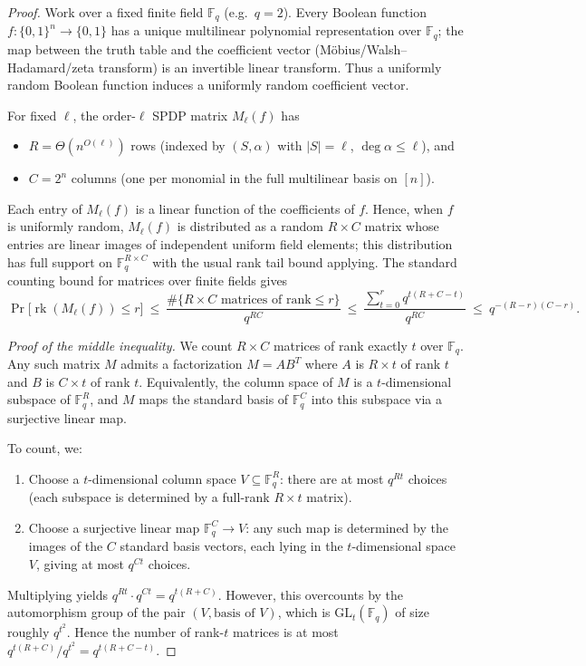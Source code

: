 \documentclass[12pt]{article}
\theoremstyle{definition}
\theoremstyle{definition}
\theoremstyle{remark}
\theoremstyle{remark}
\begin{document}
\begin{proof}
Work over a fixed finite field $\mathbb{F}_q$ (e.g.\ $q=2$). Every Boolean function $f:\{0,1\}^n\to\{0,1\}$ has a unique multilinear polynomial representation over $\mathbb{F}_q$; the map between the truth table and the coefficient vector (Möbius/Walsh--Hadamard/zeta transform) is an invertible linear transform. Thus a uniformly random Boolean function induces a uniformly random coefficient vector.

For fixed $\ell$, the order-$\ell$ SPDP matrix $M_\ell(f)$ has
\begin{itemize}
\item $R = \Theta(n^{O(\ell)})$ rows (indexed by $(S,\alpha)$ with $|S|=\ell$, $\deg\alpha\le\ell$), and
\item $C = 2^n$ columns (one per monomial in the full multilinear basis on $[n]$).
\end{itemize}

Each entry of $M_\ell(f)$ is a linear function of the coefficients of $f$. Hence, when $f$ is uniformly random, $M_\ell(f)$ is distributed as a random $R\times C$ matrix whose entries are linear images of independent uniform field elements; this distribution has full support on $\mathbb{F}_q^{R\times C}$ with the usual rank tail bound applying. The standard counting bound for matrices over finite fields gives
\[
\Pr\!\bigl[\operatorname{rk}(M_\ell(f))\le r\bigr] \ \le\ \frac{\#\{R\times C\text{ matrices of rank}\le r\}}{q^{RC}} \ \le\ \frac{\sum_{t=0}^r q^{t(R+C-t)}}{q^{RC}} \ \le\ q^{-(R-r)(C-r)}.
\]

\medskip\noindent
\textit{Proof of the middle inequality.} We count $R\times C$ matrices of rank exactly $t$ over $\mathbb{F}_q$. Any such matrix $M$ admits a factorization $M = AB^T$ where $A$ is $R\times t$ of rank $t$ and $B$ is $C\times t$ of rank $t$. Equivalently, the column space of $M$ is a $t$-dimensional subspace of $\mathbb{F}_q^R$, and $M$ maps the standard basis of $\mathbb{F}_q^C$ into this subspace via a surjective linear map.

To count, we:
\begin{enumerate}[label=(\roman*)]
\item Choose a $t$-dimensional column space $V \subseteq \mathbb{F}_q^R$: there are at most $q^{Rt}$ choices (each subspace is determined by a full-rank $R\times t$ matrix).
\item Choose a surjective linear map $\mathbb{F}_q^C \to V$: any such map is determined by the images of the $C$ standard basis vectors, each lying in the $t$-dimensional space $V$, giving at most $q^{Ct}$ choices.
\end{enumerate}
Multiplying yields $q^{Rt} \cdot q^{Ct} = q^{t(R+C)}$. However, this overcounts by the automorphism group of the pair $(V, \text{basis of } V)$, which is $\mathrm{GL}_t(\mathbb{F}_q)$ of size roughly $q^{t^2}$. Hence the number of rank-$t$ matrices is at most $q^{t(R+C)}/q^{t^2} = q^{t(R+C-t)}$.


\end{proof}
\end{document}
